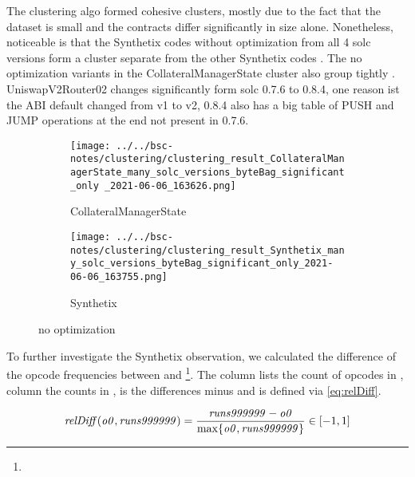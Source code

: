 \documentclass[../main.tex]{subfiles}
\begin{document}
The clustering algo formed cohesive clusters, mostly due to the fact that the dataset is small and the contracts differ significantly in size alone.
Nonetheless, noticeable is that the Synthetix codes without optimization from all 4 solc versions form a cluster separate from the other Synthetix codes . The no optimization variants in the CollateralManagerState cluster also group tightly .
UniswapV2Router02 changes significantly form solc 0.7.6 to 0.8.4, one reason ist the ABI default changed from v1 to v2, 0.8.4 also has a big table of PUSH and JUMP operations at the end not present in 0.7.6.

\begin{figure}[ht!]
  \begin{subfigure}[b]{0.5 \linewidth}
    \texttt{[image: ../../bsc-notes/clustering/clustering\_result\_CollateralManagerState\_many\_solc\_versions\_byteBag\_significant\_only \_2021-06-06\_163626.png]}%
    \caption{CollateralManagerState}
    \label{fig:CollateralManagerState}
  \end{subfigure}%
  \begin{subfigure}[b]{0.5 \linewidth}
    \texttt{[image: ../../bsc-notes/clustering/clustering\_result\_Synthetix\_many\_solc\_versions\_byteBag\_significant\_only\_2021-06-06\_163755.png]}
    \caption{Synthetix}
    \label{fig:Synthetix}
  \end{subfigure}
  \caption{no optimization}
\end{figure}

To further investigate the Synthetix observation, we calculated the difference of the opcode frequencies between  and  \footnote{}. The column  lists the count of opcodes in , column  the counts in ,  is the differences  minus  and  is defined via \eqref{eq:relDiff}.

\begin{equation}
  \mbox{\textit{relDiff}}(\mbox{\textit{o0}},\mbox{\textit{runs999999}}) = \dfrac{\mbox{\textit{runs999999}} - \mbox{\textit{o0}}}{\max\{\mbox{\textit{o0}}, \mbox{\textit{runs999999}}\}} \in [-1,1]
  \label{eq:relDiff}
\end{equation}
\end{document}
